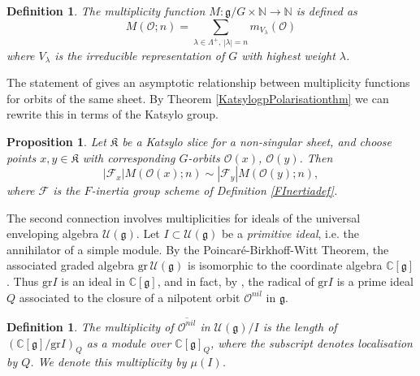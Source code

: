 \documentclass{amsart}
\newtheorem{proposition}[theorem]{Proposition}
\newtheorem{definition}[theorem]{Definition}
\theoremstyle{remark}
\numberwithin{theorem}{section}
\numberwithin{equation}{section}
\begin{document}
\begin{definition}\label{Multiplicityfndef}
    The \emph{multiplicity function} $ M:\mathfrak{g}/G \times \mathbb{N} \rightarrow \mathbb{N}$ is defined as
    \begin{equation}\label{Multiplicityfneqn}
        M(\mathcal O;n) = \sum_{\lambda \in \Lambda^+, \,|\lambda|=n} m_{V_{\lambda}}(\mathcal O)
    \end{equation}
    where $V_\lambda$ is the irreducible representation of $G$ with highest weight $\lambda$.
\end{definition}

 The statement of \cite[Theorem 7.2]{BK} gives an asymptotic relationship between multiplicity functions for orbits of the same sheet. By Theorem \ref{KatsylogpPolarisationthm} we can rewrite this in terms of the Katsylo group.

\begin{proposition}\label{KatsyloMultiplicitiesprp}
    Let $\mathfrak{K}$ be a Katsylo slice for a non-singular sheet, and choose points $x,y \in \mathfrak{K}$ with corresponding $G$-orbits $\mathcal O(x)$, $\mathcal O(y)$. Then
    \begin{equation}\label{KatsyloMultiplicities1eqn}
       |\mathcal F_x|M(\mathcal O(x);n) \sim |\mathcal F_y|M(\mathcal O(y);n), 
    \end{equation}
    where $\mathcal F$ is the $F$-inertia group scheme of Definition \ref{FInertiadef}.
\end{proposition}

The second connection involves multiplicities for ideals of the universal enveloping algebra $\mathcal U(\mathfrak{g})$. Let $I \subset \mathcal U(\mathfrak{g})$ be a \emph{primitive ideal}, i.e. the annihilator of a simple module. By the Poincaré-Birkhoff-Witt Theorem, the associated graded algebra $\text{gr}\,\mathcal U(\mathfrak{g})$ is isomorphic to the coordinate algebra $\mathbb{C}[\mathfrak{g}]$. Thus $\text{gr}I$ is an ideal in $\mathbb{C}[\mathfrak{g}]$, and in fact, by \cite[Theorem 3.10]{Joseph}, the radical of $\text{gr}I$ is a prime ideal $Q$ associated to the closure of a nilpotent orbit $\mathcal O^{nil}$ in $\mathfrak{g}$.

\begin{definition}\label{Qmultiplicitydef}
    The \emph{multiplicity of $\overline{\mathcal O^{nil}}$ in $\mathcal U(\mathfrak{g})/I$} is the length of $(\mathbb{C}[\mathfrak{g}]/\text{gr}I)_Q$ as a module over $\mathbb{C}[\mathfrak{g}]_Q$, where the subscript denotes localisation by $Q$. We denote this multiplicity by $\mu(I)$.
\end{definition}
\end{document}
